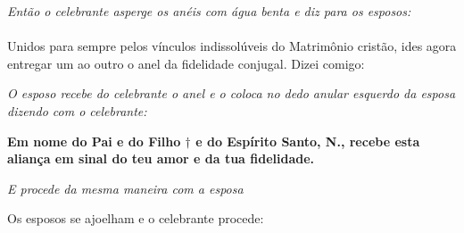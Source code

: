 \textit{Então o celebrante asperge os anéis com água benta e diz para os esposos:}
\\
\\Unidos para sempre pelos vínculos indissolúveis do Matrimônio cristão, ides
agora entregar um ao outro o anel da fidelidade conjugal. Dizei comigo:

\begin{center}
	\textit{O esposo recebe do celebrante o anel e o coloca no dedo anular esquerdo da esposa dizendo com o celebrante:}
\end{center}

\noindent \textbf{Em nome do Pai e do Filho $\dagger$ e do Espírito Santo, N., recebe esta aliança em sinal do teu amor e da tua fidelidade.}

\begin{center}
	\textit{E procede da mesma maneira com a esposa}
\end{center}

Os esposos se ajoelham e o celebrante procede:

